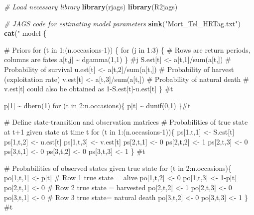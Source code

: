 \documentclass[
]{krantz}
\makeatletter
\newenvironment{Shaded}{\begin{snugshade}}{\end{snugshade}}
\newcommand{\CommentTok}[1]{\textcolor[rgb]{0.37,0.37,0.37}{\textit{#1}}}
\newcommand{\FunctionTok}[1]{\textcolor[rgb]{0.27,0.27,0.27}{\textbf{#1}}}
\newcommand{\NormalTok}[1]{#1}
\newcommand{\StringTok}[1]{\textcolor[rgb]{0.5,0.5,0.5}{#1}}
\newenvironment{kframe}{%
\medskip{}
\setlength{\fboxsep}{.8em}
 \def\at@end@of@kframe{}%
 \ifinner\ifhmode%
  \def\at@end@of@kframe{\end{minipage}}%
  \begin{minipage}{\columnwidth}%
 \fi\fi%
 \def\FrameCommand##1{\hskip\@totalleftmargin \hskip-\fboxsep
 \colorbox{shadecolor}{##1}\hskip-\fboxsep
     \hskip-\linewidth \hskip-\@totalleftmargin \hskip\columnwidth}%
 \MakeFramed {\advance\hsize-\width
   \@totalleftmargin\z@ \linewidth\hsize
   \@setminipage}}%
 {\par\unskip\endMakeFramed%
 \at@end@of@kframe}
\renewenvironment{Shaded}{\begin{kframe}}{\end{kframe}}
\makeatother
\begin{document}
\begin{Shaded}
\begin{Highlighting}[]
\CommentTok{\# Load necessary library}
\FunctionTok{library}\NormalTok{(rjags)}
\FunctionTok{library}\NormalTok{(R2jags)}

\CommentTok{\# JAGS code for estimating model parameters}
\FunctionTok{sink}\NormalTok{(}\StringTok{"Mort\_Tel\_HRTag.txt"}\NormalTok{)}
\FunctionTok{cat}\NormalTok{(}\StringTok{"}
\StringTok{model \{}

\StringTok{\# Priors}
\StringTok{for (t in 1:(n.occasions{-}1)) \{}
\StringTok{     for (j in 1:3) \{ \# Rows are return periods, columns are fates}
\StringTok{         a[t,j] \textasciitilde{} dgamma(1,1)}
\StringTok{         \} \#j}
\StringTok{     S.est[t] \textless{}{-} a[t,1]/sum(a[t,]) \# Probability of survival}
\StringTok{     u.est[t] \textless{}{-} a[t,2]/sum(a[t,]) \# Probability of harvest (exploitation rate)}
\StringTok{     v.est[t] \textless{}{-} a[t,3]/sum(a[t,]) \# Probability of natural death}
\StringTok{     \# v.est[t] could also be obtained as 1{-}S.est[t]{-}u.est[t]}
\StringTok{    \} \#t}

\StringTok{  p[1] \textasciitilde{} dbern(1)}
\StringTok{  for (t in 2:n.occasions)\{}
\StringTok{    p[t] \textasciitilde{} dunif(0,1)}
\StringTok{    \}\#t}

\StringTok{\# Define state{-}transition and observation matrices}
\StringTok{\# Probabilities of true state at t+1 given state at time t}
\StringTok{    for (t in 1:(n.occasions{-}1))\{}
\StringTok{    ps[1,t,1] \textless{}{-} S.est[t]}
\StringTok{    ps[1,t,2] \textless{}{-} u.est[t]}
\StringTok{    ps[1,t,3] \textless{}{-} v.est[t]}
\StringTok{    ps[2,t,1] \textless{}{-} 0}
\StringTok{    ps[2,t,2] \textless{}{-} 1}
\StringTok{    ps[2,t,3] \textless{}{-} 0}
\StringTok{    ps[3,t,1] \textless{}{-} 0}
\StringTok{    ps[3,t,2] \textless{}{-} 0}
\StringTok{    ps[3,t,3] \textless{}{-} 1}
\StringTok{    \} \#t}

\StringTok{\# Probabilities of observed states given true state}
\StringTok{    for (t in 2:n.occasions)\{}
\StringTok{    po[1,t,1] \textless{}{-} p[t]  \# Row 1 true state = alive}
\StringTok{    po[1,t,2] \textless{}{-} 0}
\StringTok{    po[1,t,3] \textless{}{-} 1{-}p[t]}
\StringTok{    po[2,t,1] \textless{}{-} 0     \# Row 2 true state = harvested}
\StringTok{    po[2,t,2] \textless{}{-} 1}
\StringTok{    po[2,t,3] \textless{}{-} 0}
\StringTok{    po[3,t,1] \textless{}{-} 0     \# Row 3 true state= natural death}
\StringTok{    po[3,t,2] \textless{}{-} 0}
\StringTok{    po[3,t,3] \textless{}{-} 1}
\StringTok{    \} \#t}


\end{Highlighting}
\end{Shaded}
\end{document}
